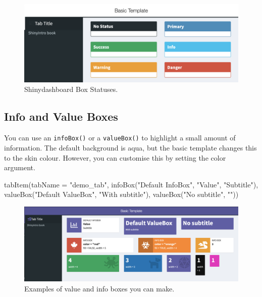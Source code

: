 \documentclass[
  oneside]{book}
\newenvironment{Shaded}{\begin{snugshade}}{\end{snugshade}}
\newcommand{\AttributeTok}[1]{\textcolor[rgb]{0.77,0.63,0.00}{#1}}
\newcommand{\FunctionTok}[1]{\textcolor[rgb]{0.00,0.00,0.00}{#1}}
\newcommand{\NormalTok}[1]{#1}
\newcommand{\StringTok}[1]{\textcolor[rgb]{0.31,0.60,0.02}{#1}}
\begin{document}
\begin{figure}

{\centering \includegraphics[width=1\linewidth]{images/sdb_box_status} 

}

\caption{Shinydashboard Box Statuses.}\label{fig:sdb-box-status}
\end{figure}

\hypertarget{info-and-value-boxes}{%
\subsection{Info and Value Boxes}\label{info-and-value-boxes}}

You can use an \texttt{infoBox}\texttt{()} or a \texttt{valueBox}\texttt{()} to highlight a small amount of information. The default background is aqua, but the basic template changes this to the skin colour. However, you can customise this by setting the \AttributeTok{color} argument.

\begin{Shaded}
\begin{Highlighting}[]
\FunctionTok{tabItem}\NormalTok{(}\AttributeTok{tabName =} \StringTok{"demo\_tab"}\NormalTok{, }\FunctionTok{infoBox}\NormalTok{(}\StringTok{"Default InfoBox"}\NormalTok{, }\StringTok{"Value"}\NormalTok{, }\StringTok{"Subtitle"}\NormalTok{), }\FunctionTok{valueBox}\NormalTok{(}\StringTok{"Default ValueBox"}\NormalTok{,}
    \StringTok{"With subtitle"}\NormalTok{), }\FunctionTok{valueBox}\NormalTok{(}\StringTok{"No subtitle"}\NormalTok{, }\StringTok{""}\NormalTok{))}
\end{Highlighting}
\end{Shaded}

\begin{figure}

{\centering \includegraphics[width=1\linewidth]{images/sdb_value_info} 

}

\caption{Examples of value and info boxes you can make.}\label{fig:sdb-value-info}
\end{figure}
\end{document}
